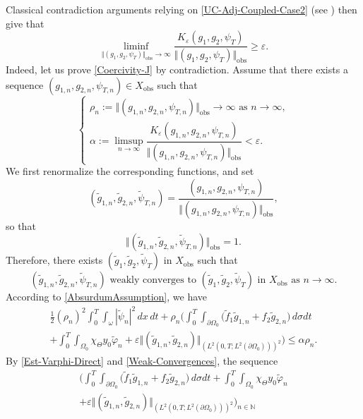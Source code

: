 \documentclass[JEP,XML,SOM,Unicode,NoFloatCountersInSection]{cedram}
\newcommand{\obs}{\mathrm{obs}}
\newcommand\N{{\mathbb N}}
\newcommand{\norm}[1]{\Vert#1\Vert}
\theoremstyle{definition}
\begin{document}
Classical contradiction arguments relying on \eqref{UC-Adj-Coupled-Case2} (see \eg \cite{Ervedoza-Note-2020}) then give that
\begin{equation}
\label{Coercivity-J}
\liminf_{\norm{(g_1, g_2, \psi_T)}_{\obs} \to \infty} \frac{K_\varepsilon(g_1, g_2, \psi_T) }{\norm{(g_1, g_2, \psi_T)}_{\obs}} \geq \varepsilon.
\end{equation}
Indeed, let us prove \eqref{Coercivity-J} by contradiction. Assume that there exists a sequence $(g_{1,n}, g_{2,n}, \psi_{T,n}) \in X_{\obs}$ such that
\begin{equation}
\label{AbsurdumAssumption}
\begin{cases}
\rho_n := \norm{(g_{1,n}, g_{2,n}, \psi_{T,n})}_{\obs} \to \infty \text{ as } n \to \infty,\\[3pt]
\alpha:=\limsup_{n \to \infty} \dfrac{K_\varepsilon(g_{1,n}, g_{2,n}, \psi_{T,n})}{\norm{(g_{1,n}, g_{2,n}, \psi_{T,n})}_{\obs}} < \varepsilon.
\end{cases}
\end{equation}
We first renormalize the corresponding functions, and set
\[
(\tilde g_{1,n}, \tilde g_{2,n}, \tilde \psi_{T,n}) = \frac{(g_{1,n}, g_{2,n}, \psi_{T,n})}{ \norm{(g_{1,n}, g_{2,n}, \psi_{T,n})}_{\obs}},
\]
so that
\begin{equation}
\label{Bound-tilde-n}
\norm{(\tilde g_{1,n}, \tilde g_{2,n}, \tilde \psi_{T,n}) }_{\obs} = 1.
\end{equation}
Therefore, there exists $(\tilde g_1, \tilde g_2, \tilde \psi_T)$ in $X_{\obs}$ such that
\begin{equation}
\label{Weak-Convergences}
(\tilde g_{1,n}, \tilde g_{2,n}, \tilde \psi_{T,n}) \text{ weakly converges to }(\tilde g_1, \tilde g_2, \tilde \psi_T) \text{ in } X_{\obs} \text{ as } n \to \infty.
\end{equation}
According to \eqref{AbsurdumAssumption}, we have
\begin{multline}
\label{J-eps-expanded}
\frac{1}{2}(\rho_n)^2 \int_0^T \int_\omega |\tilde \psi_n|^2 \, dx\,dt
+
\rho_n
\biggl(
\int_0^T \int_{\partial \Omega_0} \bigl(\tilde f_1 \tilde g_{1,n} + f_2 \tilde g_{2,n} \bigr) \, d\sigma dt\\
+
\int_0^T \int_{\Omega_0} \chi_{\Theta} y_0 \tilde \varphi_n
+
\varepsilon { \norm{(\tilde g_{1,n}, \tilde g_{2,n})}_{(L^2(0,T; L^2(\partial\Omega_0)))^2}
}
\biggr)
\leq \alpha \rho_n.
\end{multline}
By \eqref{Est-Varphi-Direct} and \eqref{Weak-Convergences}, the sequence
\begin{multline*}
\biggl(
\int_0^T \int_{\partial \Omega_0} \bigl(\tilde f_1 \tilde g_{1,n} + f_2 \tilde g_{2,n} \bigr) \, d\sigma dt
+
\int_0^T \int_{\Omega_0} \chi_{\Theta} y_0 \tilde \varphi_n\\[-10pt]
+
\varepsilon
{ \norm{(\tilde g_{1,n}, \tilde g_{2,n})}_{(L^2(0,T; L^2(\partial\Omega_0)))^2}}
\biggr)_{n \in \N}
\end{multline*}
\end{document}
